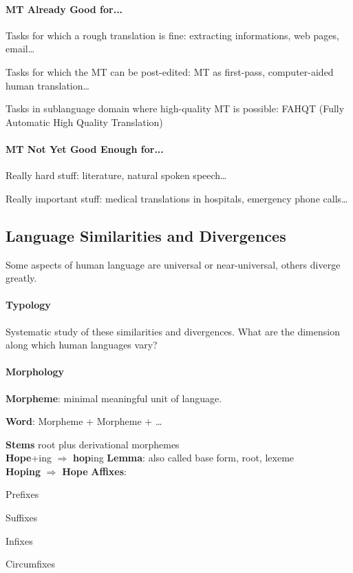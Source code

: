\documentclass[10pt]{report}
\begin{document}
\paragraph{MT Already Good for...}\begin{list}{}{}
	\item Tasks for which a rough translation is fine: extracting informations, web pages, email\ldots
	\item Tasks for which the MT can be post-edited: MT as first-pass, computer-aided human translation\ldots
	\item Tasks in sublanguage domain where high-quality MT is possible: FAHQT (Fully Automatic High Quality Translation)
\end{list}
\paragraph{MT Not Yet Good Enough for...}\begin{list}{}{}
	\item Really hard stuff: literature, natural spoken speech\ldots
	\item Really important stuff: medical translations in hospitals, emergency phone calls\ldots
\end{list}
\subsection{Language Similarities and Divergences}
Some aspects of human language are universal or near-universal, others diverge greatly.
\paragraph{Typology} Systematic study of these similarities and divergences. What are the dimension along which human languages vary?
\paragraph{Morphology}
\begin{list}{}{}
	\item \textbf{Morpheme}: minimal meaningful unit of language.
	\item \textbf{Word}: Morpheme + Morpheme + \ldots
	\item \textbf{Stems} root plus derivational morphemes\\
	\textbf{Hope}+ing $\Rightarrow$ \textbf{hop}ing
	\textbf{Lemma}: also called base form, root, lexeme\\
	\textbf{Hoping} $\Rightarrow$ \textbf{Hope}
	\textbf{Affixes}: \begin{list}{}{}
		\item Prefixes
		\item Suffixes
		\item Infixes
		\item Circumfixes
	\end{list}
\end{list}
\end{document}
